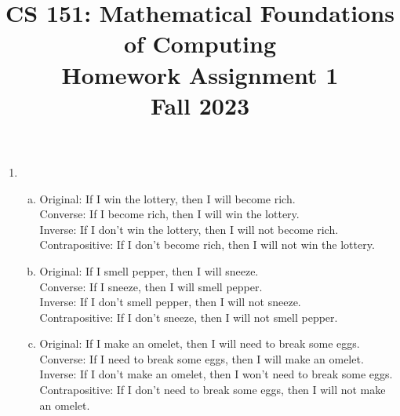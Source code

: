 \documentclass[14pt]{extarticle} %
\title{CS 151: Mathematical Foundations of Computing \\ Homework Assignment 1 \\ 
Fall 2023}
\date{}
\begin{document}
\maketitle %
\vspace{-0.75in} %

\begin{enumerate} %


    \item
    \begin{enumerate}[a.] %
        \item %
        Original: If I win the lottery, then I will become rich. \\
        Converse: If I become rich, then I will win the lottery. \\ 
        Inverse: If I don't win the lottery, then I will not become rich. \\
        Contrapositive: If I don't become rich, then I will not win the lottery. \\
        \item %
        Original: If I smell pepper, then I will sneeze. \\
        Converse: If I sneeze, then I will smell pepper. \\
        Inverse: If I don't smell pepper, then I will not sneeze. \\
        Contrapositive: If I don't sneeze, then I will not smell pepper. \\
        \item %
        Original: If I make an omelet, then I will need to break some eggs. \\
        Converse: If I need to break some eggs, then I will make an omelet. \\
        Inverse: If I don't make an omelet, then I won't need to break some eggs. \\
        Contrapositive: If I don't need to break some eggs, then I will not make an omelet.

    \end{enumerate} %


\end{enumerate}
\end{document}
